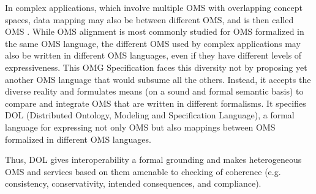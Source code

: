 \documentclass[10pt,fleqn,%
\ifpretendfinal
final%
\else
draft%
\fi,
]{scrreprt}
\makeatletter
\newcommand*{\eg}{e.g.\@\xspace}
\newcommand*\CommentAuthor{}
\renewcommand*\CommentAuthor{#1}}
\newcommand*\CommentDate{}
\renewcommand*\CommentDate{#1}}
\newcommand*\CommentId{}
\renewcommand*\CommentId{#1}}
\newcommand*\CommentType{}
\renewcommand*\CommentType{#1}}
\newcommand*{\SetCommentColorByType}[1]{%
\edef\localType{{#1}}%
\expandafter\ifstrequal\localType{q-aut}{\colorlet{CommentColor}{red}}{%
\expandafter\ifstrequal\localType{q-all}{\colorlet{CommentColor}{orange}}{%
\expandafter\ifstrequal\localType{todo}{\colorlet{CommentColor}{orange}}{%
\expandafter\ifstrequal\localType{fyi}{\colorlet{CommentColor}{lightgray}}{%
\colorlet{CommentColor}{yellow}}}}}}
\newcommand*{\SetCommentPrefixByType}[1]{%
\edef\localType{{#1}}%
\expandafter\@ifmtarg\localType{%
\edef\CommentPrefix{}%
}{%
\caseupper[q]{#1}%
\edef\CommentPrefix{\thestring: }%
}}
\newcommand*{\initComment}[1]{%
\setkeys{Comment}{#1}%
\SetCommentColorByType{\CommentType}%
\relax%
\SetCommentPrefixByType{\CommentType}%
\relax%
}
\newcommand*{\todonote}[2][]{%
\initComment{#1}%
\pdfcomment[author=\CommentAuthor,color=CommentColor,date=\CommentDate,id=\CommentId]{%
\CommentPrefix
#2}}
\renewcommand*{\todonote}[2][]{%
\initComment{#1}%
\ednote{\CommentPrefix #2}}
\newcommand*{\IS}{OMG Specification\xspace}
\makeatother
\begin{document}
In complex applications, which involve multiple OMS with overlapping concept spaces,
data mapping may also be  between different OMS, and is then called OMS . 
While OMS alignment is most commonly studied for OMS formalized in the same OMS 
language, the different OMS used by complex applications may also be written in different 
OMS languages, even if they have different levels of expressiveness. 
This \IS faces this diversity not by proposing yet another OMS language that would subsume all the others.  
Instead, it accepts the diverse reality and formulates means (on a sound and formal semantic basis) 
to compare and integrate OMS that are written in different formalisms.
It specifies DOL (Distributed Ontology, Modeling and Specification Language), a formal language for
expressing not only OMS but also mappings between OMS formalized in different OMS languages.

Thus, DOL gives interoperability a formal grounding and makes heterogeneous OMS and services based
on them amenable to checking of coherence (\eg consistency, conservativity, intended consequences,
and compliance).

\end{document}
